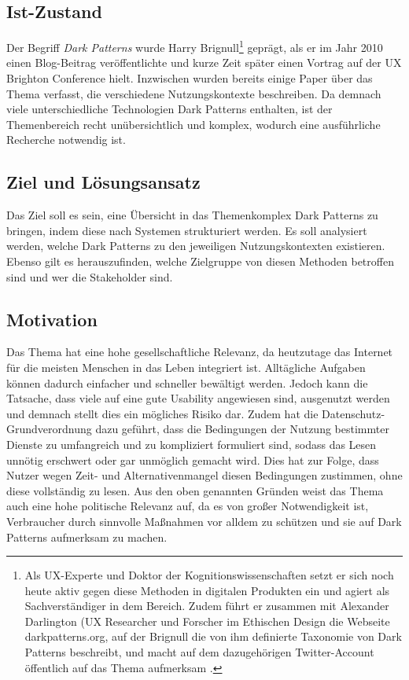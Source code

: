 \documentclass[a4paper]{article}
\begin{document}
\subsection{Ist-Zustand}
\label{sub:ist-zustand}
Der Begriff \textit{Dark Patterns} wurde Harry Brignull\footnote{\label{foot:2} Als UX-Experte und Doktor der Kognitionswissenschaften setzt er sich noch heute aktiv gegen diese Methoden in digitalen Produkten ein und agiert als Sachverständiger in dem Bereich. Zudem führt er zusammen mit Alexander Darlington (UX Researcher und Forscher im Ethischen Design die Webseite darkpatterns.org, auf der Brignull die von ihm definierte Taxonomie von Dark Patterns beschreibt, und macht auf dem dazugehörigen Twitter-Account öffentlich auf das Thema aufmerksam \cite{brignull3}\cite{brignull4}.} geprägt, als er im Jahr 2010 einen Blog-Beitrag veröffentlichte \cite{brignull1} und kurze Zeit später einen Vortrag auf der UX Brighton Conference hielt. Inzwischen wurden bereits einige Paper über das Thema verfasst, die verschiedene Nutzungskontexte beschreiben. Da demnach viele unterschiedliche Technologien Dark Patterns enthalten, ist der Themenbereich recht unübersichtlich und komplex, wodurch eine ausführliche Recherche notwendig ist.

\subsection{Ziel und Lösungsansatz}
\label{sub:ziel_und_loesungsansatz}
Das Ziel soll es sein, eine Übersicht in das Themenkomplex Dark Patterns zu bringen, indem diese nach Systemen strukturiert werden. Es soll analysiert werden, welche Dark Patterns zu den jeweiligen Nutzungskontexten existieren. Ebenso gilt es herauszufinden, welche Zielgruppe von diesen Methoden betroffen sind und wer die Stakeholder sind. 

\newpage

\subsection{Motivation}
\label{motivation}
Das Thema hat eine hohe gesellschaftliche Relevanz, da heutzutage das Internet für die meisten Menschen in das Leben integriert ist. Alltägliche Aufgaben können dadurch einfacher und schneller bewältigt werden. Jedoch kann die Tatsache, dass viele auf eine gute Usability angewiesen sind, ausgenutzt werden und demnach stellt dies ein mögliches Risiko dar. 
Zudem hat die Datenschutz-Grundverordnung dazu geführt, dass die Bedingungen der Nutzung bestimmter Dienste zu umfangreich und zu kompliziert formuliert sind, sodass das Lesen unnötig erschwert oder gar unmöglich gemacht wird. Dies hat zur Folge, dass Nutzer wegen Zeit- und Alternativenmangel diesen Bedingungen zustimmen, ohne diese vollständig zu lesen.  
Aus den oben genannten Gründen weist das Thema auch eine hohe politische Relevanz auf, da es von großer Notwendigkeit ist, Verbraucher durch sinnvolle Maßnahmen vor alldem zu schützen und sie auf Dark Patterns aufmerksam zu machen.
\end{document}
